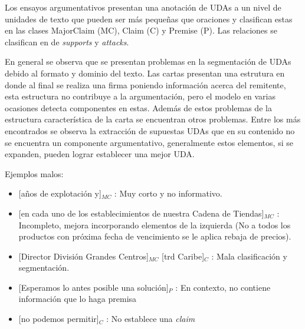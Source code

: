 Los ensayos argumentativos presentan una anotación de UDAs a un nivel de unidades de texto que pueden ser 
más pequeñas que oraciones y clasifican estas en las clases MajorClaim (MC), Claim (C) y Premise (P). Las 
relaciones se clasifican en de \emph{supports} y \emph{attacks}. 

En general se observa que se presentan problemas en la segmentación de UDAs debido al formato y dominio del texto.
Las cartas presentan una estrutura en donde al final se realiza una firma poniendo información acerca del remitente,
esta estructura no contribuye a la argumentación, pero el modelo en varias ocasiones detecta componentes en estas. 
Además de estos problemas de la estructura característica de la carta se encuentran otros problemas. Entre los más 
encontrados se observa la extracción de supuestas UDAs que en su contenido no se encuentra un componente argumentativo, 
generalmente estos elementos, si se expanden, pueden lograr establecer una mejor UDA.

Ejemplos malos:
\begin{itemize}
	\item \text{} [años de explotación y]$_{MC}$ 
	: Muy corto y no informativo. %
	\item \text{} [en cada uno de los establecimientos de nuestra Cadena de Tiendas]$_{MC}$ 
	: Incompleto, mejora incorporando elementos de la izquierda (No a todos los productos con próxima fecha de vencimiento se le aplica rebaja de precios). %
	\item \text{} [Director División Grandes Centros]$_{MC}$ [trd Caribe]$_{C}$ 
	: Mala clasificación y segmentación. %
	\item \text{} [Esperamos lo antes posible una solución]$_{P}$ 
	: En contexto, no contiene información que lo haga premisa %
	\item \text{} [no podemos permitir]$_{C}$ 
	: No establece una \emph{claim} %
\end{itemize}

